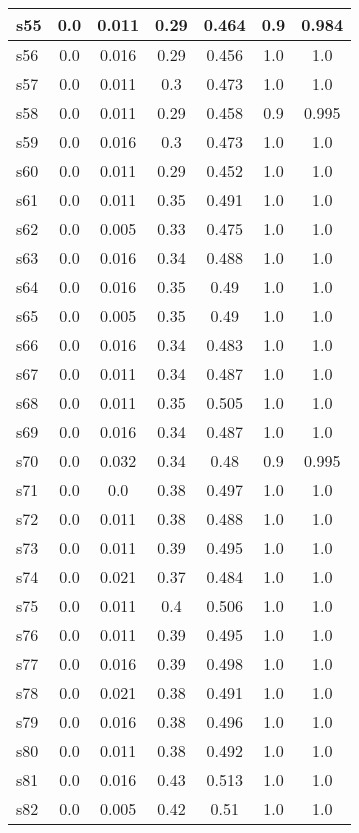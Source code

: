 \documentclass{article}
\begin{document}
\begin{tabular}{|l|c|c|c|c|c|c|}
\hline
s55 &0.0 & 0.011 & 0.29 & 0.464 & 0.9 & 0.984\\
\hline
s56 &0.0 & 0.016 & 0.29 & 0.456 & 1.0 & 1.0\\
\hline
s57 &0.0 & 0.011 & 0.3 & 0.473 & 1.0 & 1.0\\
\hline
s58 &0.0 & 0.011 & 0.29 & 0.458 & 0.9 & 0.995\\
\hline
s59 &0.0 & 0.016 & 0.3 & 0.473 & 1.0 & 1.0\\
\hline
s60 &0.0 & 0.011 & 0.29 & 0.452 & 1.0 & 1.0\\
\hline
s61 &0.0 & 0.011 & 0.35 & 0.491 & 1.0 & 1.0\\
\hline
s62 &0.0 & 0.005 & 0.33 & 0.475 & 1.0 & 1.0\\
\hline
s63 &0.0 & 0.016 & 0.34 & 0.488 & 1.0 & 1.0\\
\hline
s64 &0.0 & 0.016 & 0.35 & 0.49 & 1.0 & 1.0\\
\hline
s65 &0.0 & 0.005 & 0.35 & 0.49 & 1.0 & 1.0\\
\hline
s66 &0.0 & 0.016 & 0.34 & 0.483 & 1.0 & 1.0\\
\hline
s67 &0.0 & 0.011 & 0.34 & 0.487 & 1.0 & 1.0\\
\hline
s68 &0.0 & 0.011 & 0.35 & 0.505 & 1.0 & 1.0\\
\hline
s69 &0.0 & 0.016 & 0.34 & 0.487 & 1.0 & 1.0\\
\hline
s70 &0.0 & 0.032 & 0.34 & 0.48 & 0.9 & 0.995\\
\hline
s71 &0.0 & 0.0 & 0.38 & 0.497 & 1.0 & 1.0\\
\hline
s72 &0.0 & 0.011 & 0.38 & 0.488 & 1.0 & 1.0\\
\hline
s73 &0.0 & 0.011 & 0.39 & 0.495 & 1.0 & 1.0\\
\hline
s74 &0.0 & 0.021 & 0.37 & 0.484 & 1.0 & 1.0\\
\hline
s75 &0.0 & 0.011 & 0.4 & 0.506 & 1.0 & 1.0\\
\hline
s76 &0.0 & 0.011 & 0.39 & 0.495 & 1.0 & 1.0\\
\hline
s77 &0.0 & 0.016 & 0.39 & 0.498 & 1.0 & 1.0\\
\hline
s78 &0.0 & 0.021 & 0.38 & 0.491 & 1.0 & 1.0\\
\hline
s79 &0.0 & 0.016 & 0.38 & 0.496 & 1.0 & 1.0\\
\hline
s80 &0.0 & 0.011 & 0.38 & 0.492 & 1.0 & 1.0\\
\hline
s81 &0.0 & 0.016 & 0.43 & 0.513 & 1.0 & 1.0\\
\hline
s82 &0.0 & 0.005 & 0.42 & 0.51 & 1.0 & 1.0\\

\end{tabular}
\end{document}
